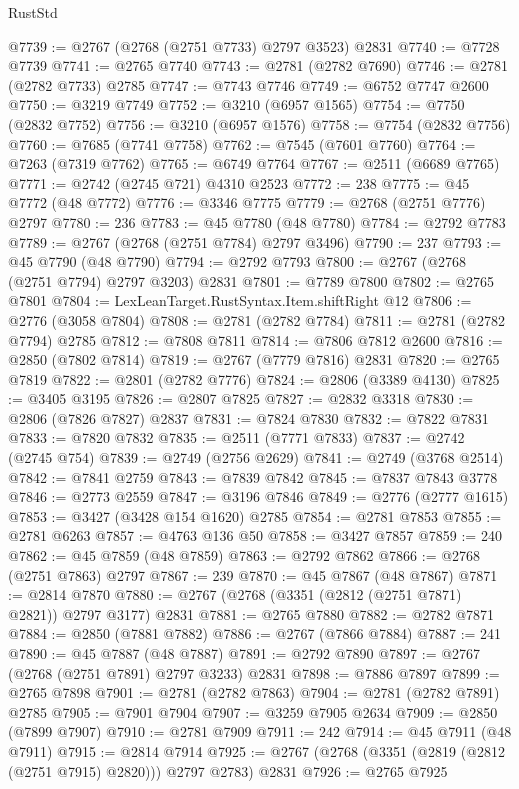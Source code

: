 \begin{lexlean}{RustStd}
\begin{coremodule}
@7739 := @2767 (@2768 (@2751 @7733) @2797 @3523) @2831
@7740 := @7728 @7739
@7741 := @2765 @7740
@7743 := @2781 (@2782 @7690)
@7746 := @2781 (@2782 @7733) @2785
@7747 := @7743 @7746
@7749 := @6752 @7747 @2600
@7750 := @3219 @7749
@7752 := @3210 (@6957 @1565)
@7754 := @7750 (@2832 @7752)
@7756 := @3210 (@6957 @1576)
@7758 := @7754 (@2832 @7756)
@7760 := @7685 (@7741 @7758)
@7762 := @7545 (@7601 @7760)
@7764 := @7263 (@7319 @7762)
@7765 := @6749 @7764
@7767 := @2511 (@6689 @7765)
@7771 := @2742 (@2745 @721) @4310 @2523
@7772 := 238
@7775 := @45 @7772 (@48 @7772)
@7776 := @3346 @7775
@7779 := @2768 (@2751 @7776) @2797
@7780 := 236
@7783 := @45 @7780 (@48 @7780)
@7784 := @2792 @7783
@7789 := @2767 (@2768 (@2751 @7784) @2797 @3496)
@7790 := 237
@7793 := @45 @7790 (@48 @7790)
@7794 := @2792 @7793
@7800 := @2767 (@2768 (@2751 @7794) @2797 @3203) @2831
@7801 := @7789 @7800
@7802 := @2765 @7801
@7804 := LexLeanTarget.RustSyntax.Item.shiftRight @12
@7806 := @2776 (@3058 @7804)
@7808 := @2781 (@2782 @7784)
@7811 := @2781 (@2782 @7794) @2785
@7812 := @7808 @7811
@7814 := @7806 @7812 @2600
@7816 := @2850 (@7802 @7814)
@7819 := @2767 (@7779 @7816) @2831
@7820 := @2765 @7819
@7822 := @2801 (@2782 @7776)
@7824 := @2806 (@3389 @4130)
@7825 := @3405 @3195
@7826 := @2807 @7825
@7827 := @2832 @3318
@7830 := @2806 (@7826 @7827) @2837
@7831 := @7824 @7830
@7832 := @7822 @7831
@7833 := @7820 @7832
@7835 := @2511 (@7771 @7833)
@7837 := @2742 (@2745 @754)
@7839 := @2749 (@2756 @2629)
@7841 := @2749 (@3768 @2514)
@7842 := @7841 @2759
@7843 := @7839 @7842
@7845 := @7837 @7843 @3778
@7846 := @2773 @2559
@7847 := @3196 @7846
@7849 := @2776 (@2777 @1615)
@7853 := @3427 (@3428 @154 @1620) @2785
@7854 := @2781 @7853
@7855 := @2781 @6263
@7857 := @4763 @136 @50
@7858 := @3427 @7857
@7859 := 240
@7862 := @45 @7859 (@48 @7859)
@7863 := @2792 @7862
@7866 := @2768 (@2751 @7863) @2797
@7867 := 239
@7870 := @45 @7867 (@48 @7867)
@7871 := @2814 @7870
@7880 := @2767 (@2768 (@3351 (@2812 (@2751 @7871) @2821)) @2797 @3177) @2831
@7881 := @2765 @7880
@7882 := @2782 @7871
@7884 := @2850 (@7881 @7882)
@7886 := @2767 (@7866 @7884)
@7887 := 241
@7890 := @45 @7887 (@48 @7887)
@7891 := @2792 @7890
@7897 := @2767 (@2768 (@2751 @7891) @2797 @3233) @2831
@7898 := @7886 @7897
@7899 := @2765 @7898
@7901 := @2781 (@2782 @7863)
@7904 := @2781 (@2782 @7891) @2785
@7905 := @7901 @7904
@7907 := @3259 @7905 @2634
@7909 := @2850 (@7899 @7907)
@7910 := @2781 @7909
@7911 := 242
@7914 := @45 @7911 (@48 @7911)
@7915 := @2814 @7914
@7925 := @2767 (@2768 (@3351 (@2819 (@2812 (@2751 @7915) @2820))) @2797 @2783) @2831
@7926 := @2765 @7925

\end{coremodule}
\end{lexlean}
